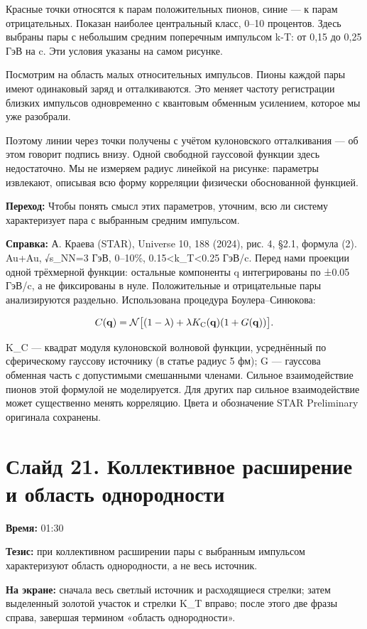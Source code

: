 \documentclass[11pt,a4paper]{article}
\begin{document}
Красные точки относятся к парам положительных пионов, синие — к парам отрицательных. Показан наиболее центральный класс, 0–10 процентов. Здесь выбраны пары с небольшим средним поперечным импульсом k-T: от 0,15 до 0,25 ГэВ на c. Эти условия указаны на самом рисунке.

Посмотрим на область малых относительных импульсов. Пионы каждой пары имеют одинаковый заряд и отталкиваются. Это меняет частоту регистрации близких импульсов одновременно с квантовым обменным усилением, которое мы уже разобрали.

Поэтому линии через точки получены с учётом кулоновского отталкивания — об этом говорит подпись внизу. Одной свободной гауссовой функции здесь недостаточно. Мы не измеряем радиус линейкой на рисунке: параметры извлекают, описывая всю форму корреляции физически обоснованной функцией.

\textbf{Переход:} Чтобы понять смысл этих параметров, уточним, всю ли систему характеризует пара с выбранным средним импульсом.

\textbf{Справка:} А. Краева (STAR), Universe 10, 188 (2024), рис. 4, §2.1, формула (2). Au+Au, √s\_NN=3 ГэВ, 0–10\%, 0.15<k\_T<0.25 ГэВ/c. Перед нами проекции одной трёхмерной функции: остальные компоненты q интегрированы по ±0.05 ГэВ/c, а не фиксированы в нуле. Положительные и отрицательные пары анализируются раздельно. Использована процедура Боулера–Синюкова:

\[C(\mathbf q)=\mathcal N\big[(1-\lambda)+\lambda K_{\rm C}(\mathbf q)(1+G(\mathbf q))\big].\]

K\_C — квадрат модуля кулоновской волновой функции, усреднённый по сферическому гауссову источнику (в статье радиус 5 фм); G — гауссова обменная часть с допустимыми смешанными членами. Сильное взаимодействие пионов этой формулой не моделируется. Для других пар сильное взаимодействие может существенно менять корреляцию. Цвета и обозначение STAR Preliminary оригинала сохранены.

\clearpage
\section*{Слайд 21. Коллективное расширение и область однородности}
\textbf{Время:} 01:30

\textbf{Тезис:} при коллективном расширении пары с выбранным импульсом характеризуют область однородности, а не весь источник.

\textbf{На экране:} сначала весь светлый источник и расходящиеся стрелки; затем выделенный золотой участок и стрелки K\_T вправо; после этого две фразы справа, завершая термином «область однородности».
\end{document}
